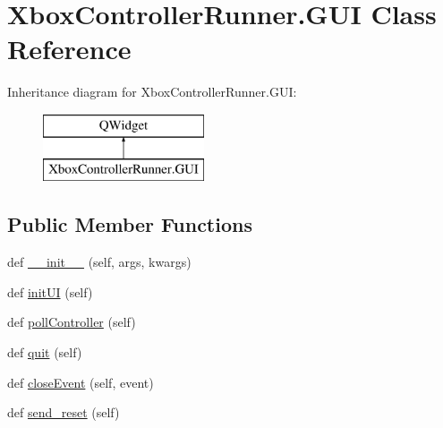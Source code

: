 \hypertarget{class_xbox_controller_runner_1_1_g_u_i}{}\section{Xbox\+Controller\+Runner.\+G\+UI Class Reference}
\label{class_xbox_controller_runner_1_1_g_u_i}
Inheritance diagram for Xbox\+Controller\+Runner.\+G\+UI\+:\begin{figure}[H]
\begin{center}
\leavevmode
\includegraphics[height=2.000000cm]{class_xbox_controller_runner_1_1_g_u_i}
\end{center}
\end{figure}
\subsection*{Public Member Functions}
\begin{DoxyCompactItemize}
\item 
def \mbox{\hyperlink{class_xbox_controller_runner_1_1_g_u_i_a345349f30ae90bbfbb2ed6d9bceeb819}{\+\_\+\+\_\+init\+\_\+\+\_\+}} (self, args, kwargs)
\item 
def \mbox{\hyperlink{class_xbox_controller_runner_1_1_g_u_i_a26f351ae3bef246b600493ce76f18119}{init\+UI}} (self)
\item 
def \mbox{\hyperlink{class_xbox_controller_runner_1_1_g_u_i_aadaff9485ea4ec6a5744197ccda8e9af}{poll\+Controller}} (self)
\item 
def \mbox{\hyperlink{class_xbox_controller_runner_1_1_g_u_i_ab06e6a41c1d8afbd4a2378e2c5d68adc}{quit}} (self)
\item 
def \mbox{\hyperlink{class_xbox_controller_runner_1_1_g_u_i_a2b096a0935c8dbaf037df7f6ada48b58}{close\+Event}} (self, event)
\item 
def \mbox{\hyperlink{class_xbox_controller_runner_1_1_g_u_i_a7cab3eedc2c645b1f3d786bd6d8edffd}{send\+\_\+reset}} (self)
\end{DoxyCompactItemize}
